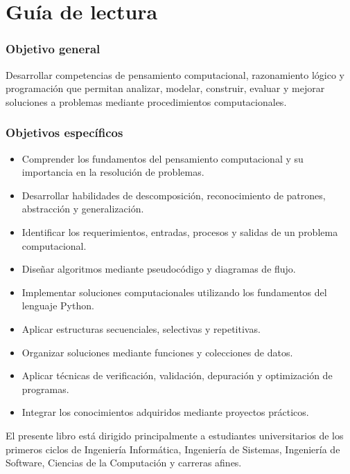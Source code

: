 \chapter{Guía de lectura}


\subsection{Objetivo general}

Desarrollar competencias de pensamiento computacional, razonamiento lógico y programación que permitan analizar, modelar, construir, evaluar y mejorar soluciones a problemas mediante procedimientos computacionales.

\subsection{Objetivos específicos}

\begin{itemize}
\item Comprender los fundamentos del pensamiento computacional y su importancia en la resolución de problemas.
\item Desarrollar habilidades de descomposición, reconocimiento de patrones, abstracción y generalización.
\item Identificar los requerimientos, entradas, procesos y salidas de un problema computacional.
\item Diseñar algoritmos mediante pseudocódigo y diagramas de flujo.
\item Implementar soluciones computacionales utilizando los fundamentos del lenguaje Python.
\item Aplicar estructuras secuenciales, selectivas y repetitivas.
\item Organizar soluciones mediante funciones y colecciones de datos.
\item Aplicar técnicas de verificación, validación, depuración y optimización de programas.
\item Integrar los conocimientos adquiridos mediante proyectos prácticos.
\end{itemize}


El presente libro está dirigido principalmente a estudiantes universitarios de los primeros ciclos de Ingeniería Informática, Ingeniería de Sistemas, Ingeniería de Software, Ciencias de la Computación y carreras afines.

